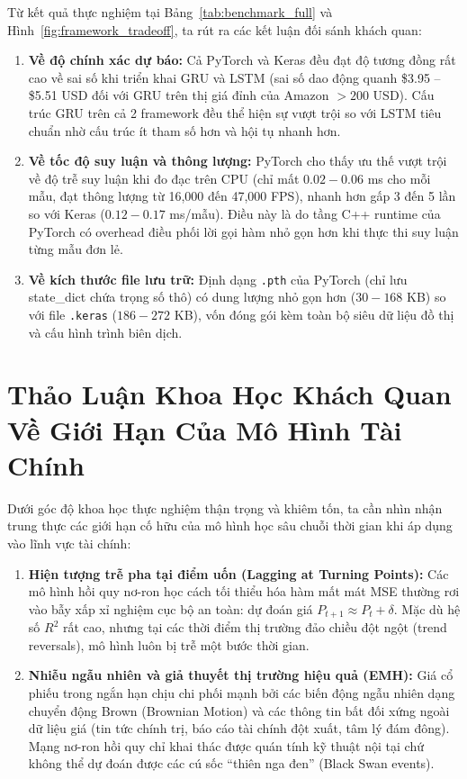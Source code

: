 \documentclass[12pt,a4paper]{report}
\begin{document}
Từ kết quả thực nghiệm tại Bảng~\ref{tab:benchmark_full} và Hình~\ref{fig:framework_tradeoff}, ta rút ra các kết luận đối sánh khách quan:
\begin{enumerate}
    \item \textbf{Về độ chính xác dự báo:} Cả PyTorch và Keras đều đạt độ tương đồng rất cao về sai số khi triển khai GRU và LSTM (sai số dao động quanh \$3.95 -- \$5.51 USD đối với GRU trên thị giá đỉnh của Amazon $> 200$ USD). Cấu trúc GRU trên cả 2 framework đều thể hiện sự vượt trội so với LSTM tiêu chuẩn nhờ cấu trúc ít tham số hơn và hội tụ nhanh hơn.
    \item \textbf{Về tốc độ suy luận và thông lượng:} PyTorch cho thấy ưu thế vượt trội về độ trễ suy luận khi đo đạc trên CPU (chỉ mất $0.02 - 0.06$ ms cho mỗi mẫu, đạt thông lượng từ 16,000 đến 47,000 FPS), nhanh hơn gấp 3 đến 5 lần so với Keras ($0.12 - 0.17$ ms/mẫu). Điều này là do tầng C++ runtime của PyTorch có overhead điều phối lời gọi hàm nhỏ gọn hơn khi thực thi suy luận từng mẫu đơn lẻ.
    \item \textbf{Về kích thước file lưu trữ:} Định dạng \texttt{.pth} của PyTorch (chỉ lưu state\_dict chứa trọng số thô) có dung lượng nhỏ gọn hơn ($30 - 168$ KB) so với file \texttt{.keras} ($186 - 272$ KB), vốn đóng gói kèm toàn bộ siêu dữ liệu đồ thị và cấu hình trình biên dịch.
\end{enumerate}

\section{Thảo Luận Khoa Học Khách Quan Về Giới Hạn Của Mô Hình Tài Chính}
Dưới góc độ khoa học thực nghiệm thận trọng và khiêm tốn, ta cần nhìn nhận trung thực các giới hạn cố hữu của mô hình học sâu chuỗi thời gian khi áp dụng vào lĩnh vực tài chính:
\begin{enumerate}
    \item \textbf{Hiện tượng trễ pha tại điểm uốn (Lagging at Turning Points):} Các mô hình hồi quy nơ-ron học cách tối thiểu hóa hàm mất mát MSE thường rơi vào bẫy xấp xỉ nghiệm cục bộ an toàn: dự đoán giá $P_{t+1} \approx P_t + \delta$. Mặc dù hệ số $R^2$ rất cao, nhưng tại các thời điểm thị trường đảo chiều đột ngột (trend reversals), mô hình luôn bị trễ một bước thời gian.
    \item \textbf{Nhiễu ngẫu nhiên và giả thuyết thị trường hiệu quả (EMH):} Giá cổ phiếu trong ngắn hạn chịu chi phối mạnh bởi các biến động ngẫu nhiên dạng chuyển động Brown (Brownian Motion) và các thông tin bất đối xứng ngoài dữ liệu giá (tin tức chính trị, báo cáo tài chính đột xuất, tâm lý đám đông). Mạng nơ-ron hồi quy chỉ khai thác được quán tính kỹ thuật nội tại chứ không thể dự đoán được các cú sốc “thiên nga đen” (Black Swan events).
\end{enumerate}
\end{document}
